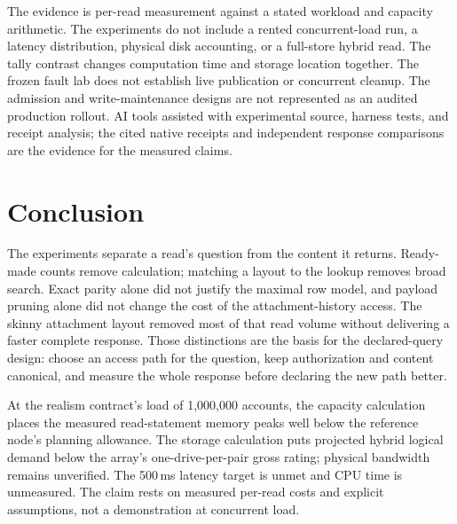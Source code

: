 \documentclass[sigconf,nonacm]{acmart}
\begin{document}
The evidence is per-read measurement against a stated workload and capacity arithmetic. The experiments do not include a rented concurrent-load run, a latency distribution, physical disk accounting, or a full-store hybrid read. The tally contrast changes computation time and storage location together. The frozen fault lab does not establish live publication or concurrent cleanup. The admission and write-maintenance designs are not represented as an audited production rollout. AI tools assisted with experimental source, harness tests, and receipt analysis; the cited native receipts and independent response comparisons are the evidence for the measured claims.

\section{Conclusion}
The experiments separate a read's question from the content it returns. Ready-made counts remove calculation; matching a layout to the lookup removes broad search. Exact parity alone did not justify the maximal row model, and payload pruning alone did not change the cost of the attachment-history access. The skinny attachment layout removed most of that read volume without delivering a faster complete response. Those distinctions are the basis for the declared-query design: choose an access path for the question, keep authorization and content canonical, and measure the whole response before declaring the new path better.

At the realism contract's load of 1,000,000 accounts, the capacity calculation places the measured read-statement memory peaks well below the reference node's planning allowance. The storage calculation puts projected hybrid logical demand below the array's one-drive-per-pair gross rating; physical bandwidth remains unverified. The 500\,ms latency target is unmet and CPU time is unmeasured. The claim rests on measured per-read costs and explicit assumptions, not a demonstration at concurrent load.
\end{document}
